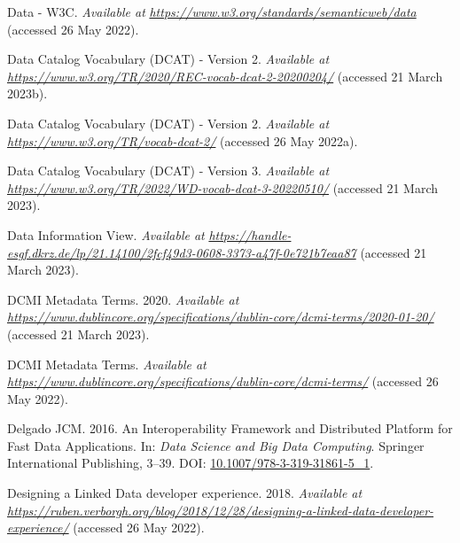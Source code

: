 \begin{CSLReferences}{1}{0}
\leavevmode{}%
Data - W3C. \emph{Available at} \href{https://www.w3.org/standards/semanticweb/data}{\emph{https://www.w3.org/standards/semanticweb/data}} (accessed 26 May 2022).

\leavevmode{}%
Data Catalog Vocabulary (DCAT) - Version 2. \emph{Available at} \href{https://www.w3.org/TR/2020/REC-vocab-dcat-2-20200204/}{\emph{https://www.w3.org/TR/2020/REC-vocab-dcat-2-20200204/}} (accessed 21 March 2023b).

\leavevmode{}%
Data Catalog Vocabulary (DCAT) - Version 2. \emph{Available at} \href{https://www.w3.org/TR/vocab-dcat-2/}{\emph{https://www.w3.org/TR/vocab-dcat-2/}} (accessed 26 May 2022a).

\leavevmode{}%
Data Catalog Vocabulary (DCAT) - Version 3. \emph{Available at} \href{https://www.w3.org/TR/2022/WD-vocab-dcat-3-20220510/}{\emph{https://www.w3.org/TR/2022/WD-vocab-dcat-3-20220510/}} (accessed 21 March 2023).

\leavevmode{}%
Data Information View. \emph{Available at} \href{https://handle-esgf.dkrz.de/lp/21.14100/2fcf49d3-0608-3373-a47f-0e721b7eaa87}{\emph{https://handle-esgf.dkrz.de/lp/21.14100/2fcf49d3-0608-3373-a47f-0e721b7eaa87}} (accessed 21 March 2023).

\leavevmode{}%
DCMI Metadata Terms. 2020. \emph{Available at} \href{https://www.dublincore.org/specifications/dublin-core/dcmi-terms/2020-01-20/}{\emph{https://www.dublincore.org/specifications/dublin-core/dcmi-terms/2020-01-20/}} (accessed 21 March 2023).

\leavevmode{}%
DCMI Metadata Terms. \emph{Available at} \href{https://www.dublincore.org/specifications/dublin-core/dcmi-terms/}{\emph{https://www.dublincore.org/specifications/dublin-core/dcmi-terms/}} (accessed 26 May 2022).

\leavevmode{}%
Delgado JCM. 2016. An Interoperability Framework and Distributed Platform for Fast Data Applications. In: \emph{Data Science and Big Data Computing}. Springer International Publishing, 3--39. DOI: \href{https://doi.org/10.1007/978-3-319-31861-5_1}{10.1007/978-3-319-31861-5\_1}.

\leavevmode{}%
Designing a Linked Data developer experience. 2018. \emph{Available at} \href{https://ruben.verborgh.org/blog/2018/12/28/designing-a-linked-data-developer-experience/}{\emph{https://ruben.verborgh.org/blog/2018/12/28/designing-a-linked-data-developer-experience/}} (accessed 26 May 2022).


\end{CSLReferences}

